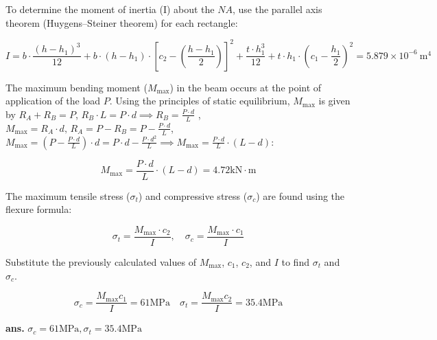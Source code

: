 \documentclass[12pt]{article}
\begin{document}
To determine the moment of inertia (I) about the $NA$, use the parallel axis theorem (Huygens–Steiner theorem) for each rectangle:

\[
I = b \cdot \frac{(h - h_1)^3}{12} + b \cdot (h - h_1) \cdot \left[ c_2 - \left( \frac{h - h_1}{2} \right) \right]^2 + \frac{t \cdot h_1^3}{12} + t \cdot h_1 \cdot \left( c_1 - \frac{h_1}{2} \right)^2 = 5.879 \times 10^{-6} \mathrm{~m}^4
\]

The maximum bending moment (\( M_{\text{max}} \)) in the beam occurs at the point of application of the load \( P \). Using the principles of static equilibrium, \( M_{\text{max}} \) is given by
\(R_A + R_B = P\), \(R_B \cdot L = P \cdot d \implies R_B = \frac{P \cdot d}{L}\) ,\(M_{\text{max}} = R_A \cdot d, \, R_A = P - R_B = P - \frac{P \cdot d}{L} \), \(M_{\text{max}} = \left( P - \frac{P \cdot d}{L} \right) \cdot d = P \cdot d - \frac{P \cdot d^2}{L} \implies M_{\text{max}} = \frac{P \cdot d}{L} \cdot (L - d)\):

\[
M_{\text{max}} = \frac{P \cdot d}{L} \cdot (L - d) = 4.72 \mathrm{kN} \cdot \mathrm{m}
\]


The maximum tensile stress (\( \sigma_t \)) and compressive stress (\( \sigma_c \)) are found using the flexure formula:

\[
\sigma_t = \frac{M_{\text{max}} \cdot c_2}{I}, \quad \sigma_c = \frac{M_{\text{max}} \cdot c_1}{I}
\]

Substitute the previously calculated values of \( M_{\text{max}} \), \( c_1 \), \( c_2 \), and \( I \) to find \( \sigma_t \) and \( \sigma_c \).


\[\sigma_c=\frac{M_{\max } c_1}{I}=61 \mathrm{MPa} \quad \sigma_t=\frac{M_{\max } c_2}{I}=35.4 \mathrm{MPa}\]

\AnswerTag













\vfill
\begin{flushright}
\textbf{ans.} \(\sigma_c=61 \mathrm{MPa}, \sigma_t=35.4 \mathrm{MPa}\)
\end{flushright}

\newpage
\end{document}
